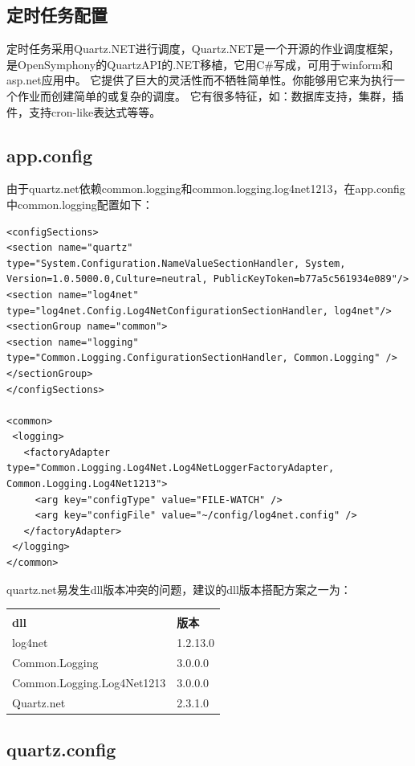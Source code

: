 \documentclass{book}
\begin{document}
\subsection{定时任务配置}

定时任务采用Quartz.NET进行调度，Quartz.NET是一个开源的作业调度框架，
是OpenSymphony的QuartzAPI的.NET移植，它用C\#写成，可用于winform和asp.net应用中。
它提供了巨大的灵活性而不牺牲简单性。你能够用它来为执行一个作业而创建简单的或复杂的调度。
它有很多特征，如：数据库支持，集群，插件，支持cron-like表达式等等。

\subsection{app.config}
由于quartz.net依赖common.logging和common.logging.log4net1213，在app.config中common.logging配置如下：
\begin{lstlisting}
<configSections>
<section name="quartz" type="System.Configuration.NameValueSectionHandler, System, Version=1.0.5000.0,Culture=neutral, PublicKeyToken=b77a5c561934e089"/>
<section name="log4net" type="log4net.Config.Log4NetConfigurationSectionHandler, log4net"/>
<sectionGroup name="common">
<section name="logging" type="Common.Logging.ConfigurationSectionHandler, Common.Logging" />
</sectionGroup>
</configSections>

<common>
 <logging>
   <factoryAdapter type="Common.Logging.Log4Net.Log4NetLoggerFactoryAdapter, Common.Logging.Log4Net1213">
     <arg key="configType" value="FILE-WATCH" />
     <arg key="configFile" value="~/config/log4net.config" />
   </factoryAdapter>
 </logging>
</common>
\end{lstlisting}

quartz.net易发生dll版本冲突的问题，建议的dll版本搭配方案之一为：


\begin{tabular}{ll}
	\multirow{1}{*}{}			
	& \multicolumn{1}{c}{}\\
	\textbf{dll} & \textbf{版本}\\
	log4net & 1.2.13.0\\
	Common.Logging & 3.0.0.0\\
	Common.Logging.Log4Net1213 & 3.0.0.0\\
	Quartz.net & 2.3.1.0\\							
\end{tabular}


\subsection{quartz.config}
\end{document}
